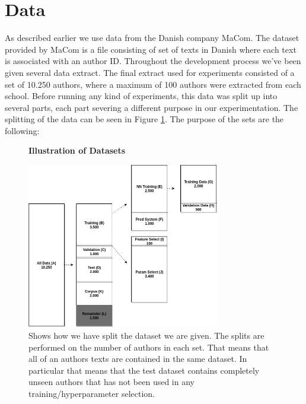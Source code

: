 \section{Data} \label{sec:data}

As described earlier we use data from the Danish company MaCom. The dataset
provided by MaCom is a file consisting of set of texts in Danish where each text
is associated with an author ID. Throughout the development process we've
been given several data extract. The final extract used for experiments
consisted of a set of 10.250 authors, where a maximum of 100 authors were
extracted from each school.
Before running any kind of experiments, this data was split up into several
parts, each part severing a different purpose in our experimentation. The
splitting of the data can be seen in Figure \ref{fig:data_split}. The
purpose of the sets are the following:

\begin{figure}
    \centering
    \textbf{Illustration of Datasets}\par\medskip
    \includegraphics[width=0.75\textwidth]{./pictures/data/Data.png}
    \caption{Shows how we have split the dataset we are given. The splits are
        performed on the number of authors in each set. That means that all of
        an authors texts are contained in the same dataset. In particular that
        means that the test dataset contains completely unseen authors that has
        not been used in any training/hyperparameter selection.}
    \label{fig:data_split}
\end{figure}

